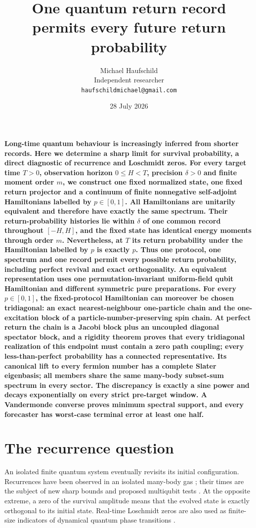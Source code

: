 \documentclass[12pt]{article}
\title{\bfseries One quantum return record permits every future return probability}
\author{Michael Haufschild\\[2pt]\small Independent researcher\\
\small \texttt{haufschildmichael@gmail.com}}
\date{28 July 2026}
\begin{document}
\maketitle

\noindent\textbf{Long-time quantum behaviour is increasingly inferred from
shorter records. Here we determine a sharp limit for survival probability,
a direct diagnostic of recurrence and Loschmidt zeros. For every target
time \(T>0\), observation horizon \(0\leq H<T\), precision \(\delta>0\)
and finite moment order \(m\), we construct one fixed normalized state, one
fixed return projector and a continuum of finite nonnegative self-adjoint
Hamiltonians labelled by \(p\in[0,1]\). All Hamiltonians are unitarily
equivalent and therefore have exactly the same spectrum. Their
return-probability histories lie within \(\delta\) of one common record
throughout \([-H,H]\), and the fixed state has identical energy moments
through order \(m\). Nevertheless, at \(T\) its return probability under
the Hamiltonian labelled by \(p\) is exactly \(p\). Thus one protocol, one
spectrum and one record permit every possible return probability, including
perfect revival and exact orthogonality. An equivalent representation uses
one permutation-invariant uniform-field qubit Hamiltonian and different
symmetric pure preparations. For every \(p\in[0,1]\), the fixed-protocol
Hamiltonian can moreover be chosen tridiagonal: an exact nearest-neighbour
one-particle chain and the one-excitation block of a
particle-number-preserving spin chain. At perfect return the chain is a
Jacobi block plus an uncoupled diagonal spectator block, and a rigidity
theorem proves that every tridiagonal realization of this endpoint must
contain a zero path coupling; every less-than-perfect probability has a
connected representative. Its canonical lift to every fermion number
has a complete Slater eigenbasis; all members share
the same many-body subset-sum spectrum in every sector. The discrepancy is
exactly a sine power and decays exponentially on every strict pre-target
window. A Vandermonde converse proves minimum spectral support, and every
forecaster has worst-case terminal error at least one half.}

\section*{The recurrence question}

An isolated finite quantum system eventually revisits its initial
configuration. Recurrences have been observed in an isolated many-body gas
\cite{Rauer2018}; their times are the subject of new sharp bounds
\cite{KotowskiOszmaniec2026,GuptaShort2026} and proposed multiqubit tests
\cite{Karimi2026}. At the opposite extreme, a zero of the survival amplitude
means that the evolved state is exactly orthogonal to its initial state.
Real-time Loschmidt zeros are also used as finite-size indicators of
dynamical quantum phase transitions
\cite{Heyl2018,Zhou2021,Novotny2026}.
\end{document}
